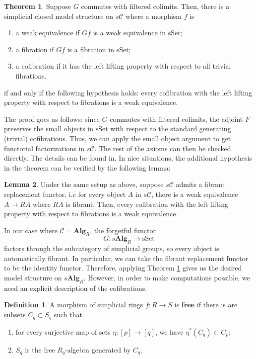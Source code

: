 \documentclass{article}
\theoremstyle{definition}
\newtheorem{theorem}{Theorem}[section]
\theoremstyle{definition}
\newtheorem{definition}{Definition}[theorem]
\theoremstyle{definition}
\theoremstyle{definition}
\theoremstyle{definition}
\newtheorem{lemma}[theorem]{Lemma}
\theoremstyle{definition}
\theoremstyle{definition}
\begin{document}
\begin{theorem}
	\label{transfer_theorem}
Suppose $G$ commutes with filtered colimits. Then, there is a simplicial closed model structure on $s\mathcal{C}$ where a morphism $f$ is
\begin{enumerate}
	\item a weak equivalence if $Gf$ is a weak equivalence in $\textrm{sSet}$;
	\item a fibration if $Gf$ is a fibration in $\textrm{sSet}$;
	\item a cofibration if it has the left lifting property with respect to all trivial fibrations.
\end{enumerate}
if and only if the following hypothesis holds: every cofibration with the left lifting property with respect to fibrations is a weak equivalence.

\end{theorem}
The proof goes as follows: since $G$ commutes with filtered colimits, the adjoint $F$ preserves the small objects in $\textrm{sSet}$ with respect to the standard generating (trivial) cofibrations. Thus, we can apply the small object argument to get functorial factorizations in $s\mathcal{C}$. The rest of the axioms can then be checked directly. The details can be found in. In nice situations, the additional hypothesis in the theorem can be verified by the following lemma:
\begin{lemma}
	Under the same setup as above, suppose $s \mathcal{C}$ admits a fibrant replacement functor, i.e for every object $A$ in $s \mathcal{C}$, there is a weak equivalence $A\to RA$ where $RA$ is fibrant. Then, every cofibration with the left lifting property with respect to fibrations is a weak equivalence.
\end{lemma}

In our case where $\mathcal{C} = \textbf{Alg}_R$, the forgetful functor 
\[G: s\textbf{Alg}_R \to \textrm{sSet}\]
factors through the subcategory of simplicial groups, so every object is automatically fibrant. In particular, we can take the fibrant replacement functor to be the identity functor. Therefore, applying Theorem \ref{transfer_theorem} gives us the desired model structure on $s\textbf{Alg}_R$. However, in order to make computations possible, we need an explicit description of the cofibrations.

\begin{definition}
		A morphism of simplicial rings $f: R\to S$ is \textbf{free} if there is are subsets $C_q\subset S_q$ such that 
	\begin{enumerate}
		\item for every surjective map of sets $\eta: [p]\to [q]$, we have $\eta^*(C_q)\subset C_p$;
		\item $S_q$ is the free $R_q$-algebra generated by $C_q$.
	\end{enumerate}
\end{definition}
\end{document}
